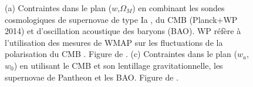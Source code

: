 \documentclass[../main/main.tex]{subfiles}
\begin{document}
\begin{figure}[ht]
\centering
{}\hfill
{}
\caption[]{(a) Contraintes dans le plan
  ($w$,$\Omega_{M}$) en combinant les sondes
  cosmologiques de supernovae de type Ia \citep[JLA,][]{Betoule2014}, du CMB (Planck+WP 2014) et d'oscillation
  acoustique des baryons (BAO). WP réfère à l'utilisation des mesures de
  WMAP sur les fluctuations de la polarisation du CMB \citep{Bennett2013}. Figure de \citet{Betoule2014}. (c)
  Contraintes dans le plan ($w_{a}$,$w_{0}$) en utilisant le
  CMB et son lentillage gravitationnelle, les supernovae de Pantheon
  \citep{Scolnicpantheon18} et les BAO. Figure de \citet{Planckparams2018}.}
\label{fig:darkenergy}
\end{figure}

%
%
\end{document}
